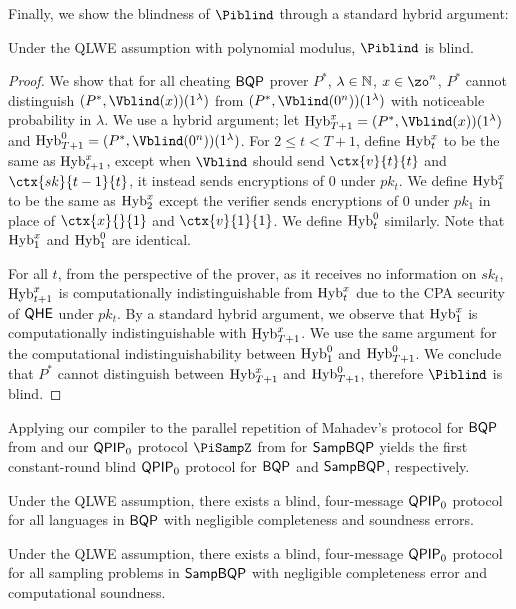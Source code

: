 Finally, we show the blindness of $\Piblind$ through a standard hybrid argument:
\begin{thm} \label{thm:compiler-blindness}
    Under the QLWE assumption with polynomial modulus, $\Piblind$ is blind.
\end{thm}
\begin{proof}
    We show that for all cheating $\operatorname{\mathsf{BQP}}$ prover $P^*$, $\lambda\in\mathbb{N}$, $x\in\zo^n$,
    $P^*$ cannot distinguish $(P^*, \Vblind(x))(1^\lambda)$ from $(P^*, \Vblind(0^n))(1^\lambda)$ with noticeable probability in $\lambda$.
    We use a hybrid argument; let $\Hyb_{T+1}^x=(P^*, \Vblind(x))(1^\lambda)$ and $\Hyb_{T+1}^0=(P^*, \Vblind(0^n))(1^\lambda)$.
    For $2\leq t<T+1$, define $\operatorname{Hyb}_t^x$ to be the same as $\operatorname{Hyb}_{t+1}^x$,
    except when $\Vblind$ should send $\ctx{v}{t}{t}$ and $\ctx{sk}{t-1}{t}$, it instead sends encryptions of $0$ under $pk_t$.
    We define $\operatorname{Hyb}_1^x$ to be the same as $\operatorname{Hyb}_2^x$ except the verifier sends encryptions of $0$ under $pk_1$ in place of $\ctx{x}{}{1}$ and $\ctx{v}{1}{1}$.
    We define $\operatorname{Hyb}_t^0$ similarly. Note that $\operatorname{Hyb}_1^x$ and $\operatorname{Hyb}_1^0$ are identical.

    For all $t$, from the perspective of the prover,
    as it receives no information on $sk_t$,
    $\operatorname{Hyb}_{t+1}^x$ is computationally indistinguishable from $\operatorname{Hyb}_t^x$ due to the CPA security of $\mathsf{QHE}$ under $pk_t$.
    By a standard hybrid argument, we observe that $\operatorname{Hyb}_1^x$ is computationally indistinguishable with $\operatorname{Hyb}_{T+1}^x$.
    We use the same argument for the computational indistinguishability between $\operatorname{Hyb}_1^0$ and $\operatorname{Hyb}_{T+1}^0$.
    We conclude that $P^*$ cannot distinguish between $\operatorname{Hyb}_{T+1}^x$ and $\operatorname{Hyb}_{T+1}^0$,
    therefore $\Piblind$ is blind.
\end{proof}

Applying our compiler to the parallel repetition of Mahadev's protocol for $\operatorname{\mathsf{BQP}}$ from \cite{arXiv:ChiaChungYam19, arXiv:AlaChiHun19} and our $\operatorname{\mathsf{QPIP}}_0$ protocol $\PiSampZ$ from  for $\operatorname{\mathsf{SampBQP}}$ yields the first constant-round blind $\operatorname{\mathsf{QPIP}}_0$ protocol for $\operatorname{\mathsf{BQP}}$ and $\operatorname{\mathsf{SampBQP}}$, respectively.

\begin{thm}
    Under the QLWE assumption, there exists a blind, four-message $\operatorname{\mathsf{QPIP}}_0$ protocol for all languages in $\operatorname{\mathsf{BQP}}$ with negligible completeness and soundness errors.
\end{thm}

\begin{thm}
        Under the QLWE assumption, there exists a blind, four-message $\operatorname{\mathsf{QPIP}}_0$ protocol for all sampling problems in $\operatorname{\mathsf{SampBQP}}$ with negligible completeness error and computational soundness.
\end{thm}


